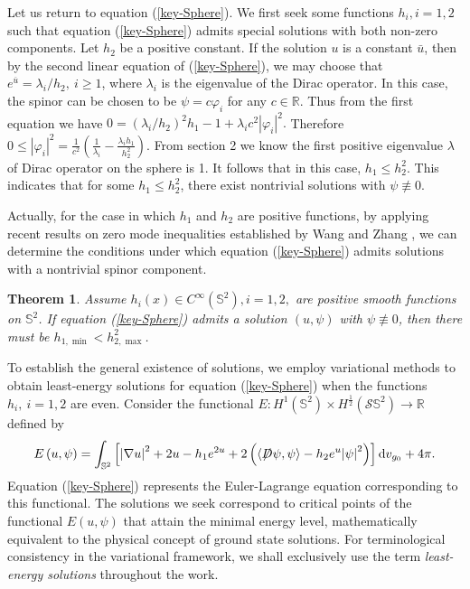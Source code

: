 \documentclass[a4paper, 12pt]{article}
\newtheorem{theorem}{Theorem}[section]
\def\slashiii#1{\setbox0=\hbox{$#1$}#1\hskip-\wd0\hbox to\wd0{\hss\sl/\/\hss}}
\begin{document}
Let us return to equation (\ref{key-Sphere}). We first seek some functions $h_i,i=1,2$ such that equation (\ref{key-Sphere}) admits special solutions with both non-zero components. Let $h_2$ be a positive constant. If the solution $u$ is a constant $\bar u$, then by the second linear equation of (\ref{key-Sphere}), we may choose that ${e^{\overline u }} = {\lambda _i}/{h_2},\ i\geq 1$, where $\lambda_i$ is the eigenvalue of the Dirac operator. In this case, the spinor can be chosen to be $\psi=c\varphi_i$ for any $c\in \mathbb{R}$. Thus from the first equation we have  $0 = {\left( \lambda _i/{h_2}\right) ^2}{h_1} - 1 + {\lambda _i}{c^2}\left| {{\varphi _i}} \right|^2.$	Therefore $0 \leq \left| {{\varphi _i}} \right|^2 = \frac{1}{{{c^2}}}\left( {\frac{1}{{{\lambda _i}}} -\frac{{\lambda _i}{h_1}}{h^2_2}} \right)$.  From section 2 we know the first positive eigenvalue $\lambda$ of Dirac operator on the sphere is 1. It follows that in this case, \(h_1 \leq h_2^2\). This indicates that for some \(h_1 \leq h_2^2\), there exist nontrivial solutions with $\psi  \not \equiv 0$.

Actually, for the case in which  $h_1$ and $h_2$ are positive functions, by applying recent results on zero mode inequalities established by Wang and Zhang \cite{wang2025conformal}, we can determine the conditions under which equation (\ref{key-Sphere}) admits solutions with a nontrivial spinor component.
\begin{theorem}\label{trivial-condation}
	Assume $h_i(x) \in C^{\infty}(\mathbb{S}^2),i=1,2,$ are positive smooth functions on $\mathbb{S}^2$. If equation (\ref{key-Sphere}) admits a solution \((u,\psi)\) with \(\psi \not\equiv 0\), then there must be \( h_{1,\min} < h_{2,\max}^2 \).
\end{theorem}

To establish the general existence of solutions, we employ variational methods to obtain  least-energy solutions for equation (\ref{key-Sphere}) when the functions \( h_i,\ i=1,2 \) are even. Consider the functional \(E: {H^1}({\mathbb{S}^2}) \times {H^{\frac{1}{2}}}(\mathcal{S} {\mathbb{S}^2})\to \mathbb{R} \) defined by
\begin{equation}\label{Functional}
	E\left( {u,\psi } \right) = \int_{{\mathbb{S}^2}} {\left[ {{{\left| {\nabla u} \right|}^2} + 2u - h_1{e^{2u}} + 2\left( {\left\langle {\slashiii{D}\psi ,\psi } \right\rangle  - h_2{e^{u}}{{\left| \psi  \right|}^2}} \right)} \right]{\text{d}{v}_{g_0}}}  + 4\pi.
\end{equation}
Equation (\ref{key-Sphere}) represents the Euler-Lagrange equation corresponding to this functional. The solutions we seek correspond to critical points of the functional \(E(u,\psi)\) that attain the minimal energy level, mathematically equivalent  to the physical concept of ground state solutions. For terminological consistency in the variational framework, we shall exclusively use the term \textit{least-energy solutions} throughout the work.
\end{document}
